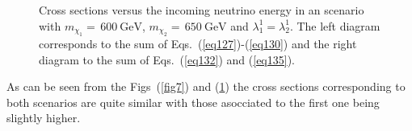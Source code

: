 \documentclass[aps,preprint,tightenlines,floatfix,superscriptaddress,nofootinbib,showpacs]{revtex4-1}
\begin{document}
\begin{center}
\begin{figure}[H]
\centering
\hspace*{4mm}
\caption{Cross sections versus the incoming neutrino energy in an scenario with $m_{\chi_1}=\, 600~\mathrm{GeV}$, $m_{\chi_2}=\,650~\mathrm{GeV}$ and $\lambda^1_1=\lambda^1_2$. The left diagram corresponds to the sum of Eqs.~(\ref{eq127})-(\ref{eq130}) and the right diagram to the sum of Eqs.~(\ref{eq132}) and (\ref{eq135}).}
\label{fig8}
\end{figure}
\end{center}
\par As can be seen from the Figs~(\ref{fig7}) and (\ref{fig8}) the cross sections corresponding to both scenarios are quite similar with those asocciated to the first one being slightly higher.
\end{document}
